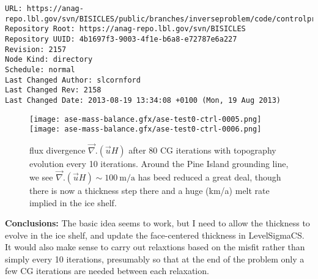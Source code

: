\documentclass{article}
\begin{document}
\begin{verbatim}
URL: https://anag-repo.lbl.gov/svn/BISICLES/public/branches/inverseproblem/code/controlproblem
Repository Root: https://anag-repo.lbl.gov/svn/BISICLES
Repository UUID: 4b1697f3-9003-4f1e-b6a8-e72787e6a227
Revision: 2157
Node Kind: directory
Schedule: normal
Last Changed Author: slcornford
Last Changed Rev: 2158
Last Changed Date: 2013-08-19 13:34:08 +0100 (Mon, 19 Aug 2013)
\end{verbatim}


\begin{figure}
\begin{center}
\texttt{[image: ase-mass-balance.gfx/ase-test0-ctrl-0005.png]}
\texttt{[image: ase-mass-balance.gfx/ase-test0-ctrl-0006.png]}
\end{center}
\caption{\protect{\label{fig::divuh10}}} flux divergence $\vec{\nabla}. (\vec{u} H)$
after 80 CG iterations with topography evolution every 10 iterations. 
Around the Pine Island grounding line, we see $\vec{\nabla}. (\vec{u} H) \sim 100~\mbox{m/a}$ has
beed reduced a great deal, though there is now a thickness step there and a huge (km/a) melt rate
implied in the ice shelf.
\end{figure}

{\large {\bf Conclusions:}} The basic idea seems to work, but I need to allow the thickness to evolve in the ice shelf, and
update the face-centered thickness in LevelSigmaCS. It would also make sense to carry out relaxtions based on the misfit rather
than simply every 10 iterations, presumably so that at the end of the problem only a few CG iterations are needed 
between each relaxation.




\end{document}
